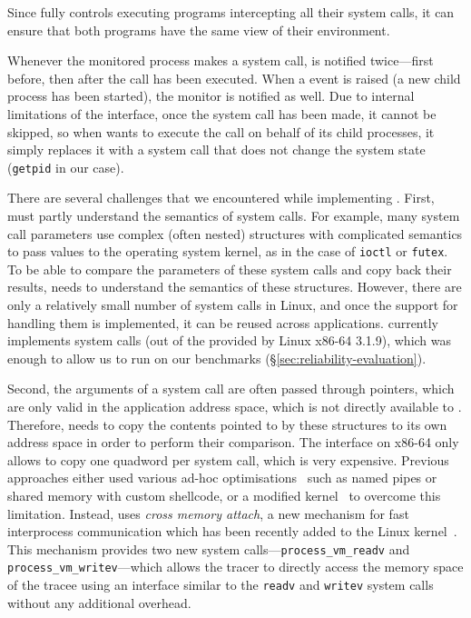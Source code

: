 Since \mxm fully controls executing programs intercepting all their
system calls, it can ensure that both programs have the same view of
their environment.

Whenever the monitored process makes a system call, \mxm is notified
twice---first before, then after the call has been executed.  When a
\ptrace event is raised (\eg a new child process has been started),
the monitor is notified as well.  Due to internal limitations of the
\ptrace interface, once the system call has been made, it cannot be
skipped, so when \mxm wants to execute the call on behalf of its child
processes, it simply replaces it with a system call that does not
change the system state (\lstinline`getpid` in our case).

There are several challenges that we encountered while implementing
\mxm.  First, \mxm must partly understand the semantics of 
system calls.  For example, many system call parameters use complex
(often nested) structures with complicated semantics to pass values to
the operating system kernel, as in the case of \lstinline`ioctl` or
\lstinline`futex`.  To be able to compare the parameters of
these system calls and copy back their results, \mxm needs to
understand the semantics of these structures.  However, there are only
a relatively small number of system calls in Linux, and once the support
for handling them is implemented, it can be reused across applications.
\mxm currently implements \syscallsImplemented system calls (out of the
\syscallsTotal provided by Linux x86-64 3.1.9), which was enough to
allow us to run \mx on our benchmarks
(\S\ref{sec:reliability-evaluation}).

Second, the arguments of a system call are often passed through pointers,
which are only valid in the application address space, which is not directly
available to \mxm.  Therefore, \mxm needs to copy the contents pointed to by
these structures to its own address space in order to perform their
comparison.  The \ptrace interface on x86-64 only allows to copy one quadword
per system call, which is very expensive. Previous approaches either used
various ad-hoc optimisations~\cite{orchestra09} such as named pipes or shared
memory with custom shellcode, or a modified kernel~\cite{tachyon12} to
overcome this limitation. Instead, \mxm uses \emph{cross memory attach}, a new
mechanism for fast interprocess communication which has been recently added to
the Linux kernel~\cite{crossmemoryattach}.  This mechanism provides two new
system calls---\lstinline`process_vm_readv` and
\lstinline`process_vm_writev`---which allows the tracer to directly access the
memory space of the tracee using an interface similar to the \lstinline`readv`
and \lstinline`writev` system calls without any additional overhead.

